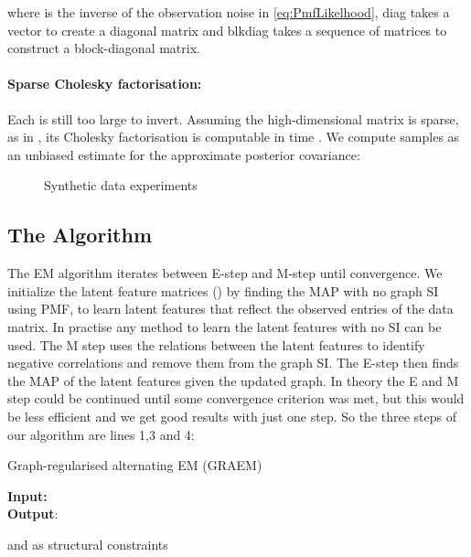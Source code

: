 \documentclass{article}
\theoremstyle{plain}
\theoremstyle{definition}
\theoremstyle{remark}
\begin{document}
where  is the inverse of the observation noise in \eqref{eq:PmfLikelhood}, diag takes a vector to create a diagonal matrix and blkdiag takes a sequence of matrices to construct a block-diagonal matrix.

\paragraph{Sparse Cholesky factorisation:} 

Each  is still too large to invert. Assuming the high-dimensional matrix is sparse, as in \citet{zhang2018largescaleprec}, its Cholesky factorisation is computable in  time \cite{davis2004column}. We compute  samples as an unbiased estimate for the approximate posterior covariance:



\begin{figure*}[t!]
\centering
{}

\caption{Synthetic data experiments} \label{fig:SynthDataExps}
\end{figure*}



\subsection{The Algorithm}
The EM algorithm iterates between E-step and M-step until convergence.  We initialize the latent feature matrices () by finding the MAP with no graph SI using PMF, to learn latent features that reflect the observed entries of the data matrix. In practise any method to learn the latent features with no SI can be used. The M step uses the relations between the latent features to identify negative correlations and remove them from the graph SI. The E-step then finds the MAP of the latent features given the updated graph. In theory the E and M step could be continued until some convergence criterion was met, but this would be less efficient and we get good results with just one step. So the three steps of our algorithm are lines 1,3 and 4:
\begin{algorithm}
\caption{Graph-regularised alternating EM (GRAEM)}
\hspace*{\algorithmicindent} \textbf{Input: } \\
 \hspace*{\algorithmicindent} \textbf{Output}: 
 \begin{algorithmic}[1]
\STATE 
{}
\STATE    {}  and  as structural constraints
\STATE   {}  
\ENDWHILE
\end{algorithmic} \label{algo:GPMF}
\end{algorithm}
\end{document}
